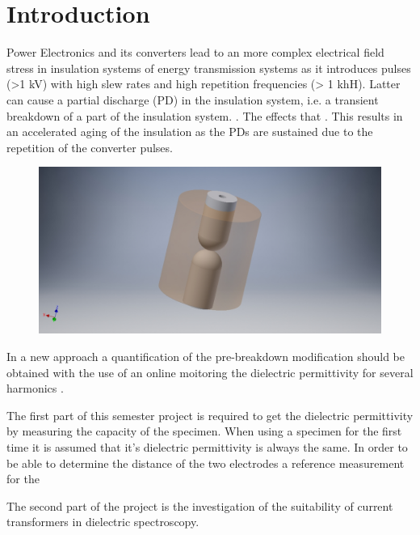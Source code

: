 
\chapter{Introduction}
Power Electronics and its converters lead to an more complex electrical field stress in insulation systems of energy transmission systems as it introduces pulses (>1 kV) with high slew rates and high repetition frequencies (> 1 khH). Latter can cause a partial discharge (PD) in the insulation system, i.e. a transient breakdown of a part of the insulation system. \cite{TransformerEngineering}. The effects that . This results in an accelerated aging of the insulation as the PDs are sustained due to the repetition of the converter pulses. 
\newline


\begin{figure}
\includegraphics[width=\textwidth]{figures/intro/epoxy_specimen.jpg}
\end{figure}
In a new approach a quantification of the pre-breakdown modification should be obtained with the use of an online moitoring the dielectric permittivity for several harmonics \cite{FaerberMVISS}.

The first part of this semester project is required to get the dielectric permittivity by measuring the capacity of the specimen. When using a specimen for the first time it is assumed that it's dielectric permittivity is always the same. In order to be able to determine the distance of the two electrodes a reference measurement for the 

The second part of the project is the investigation of the suitability of current transformers in dielectric spectroscopy. 

